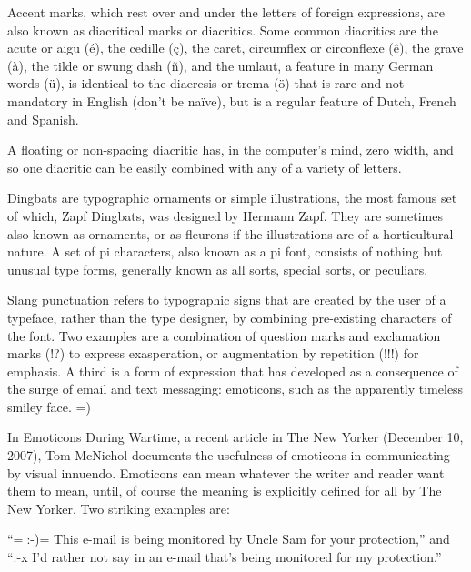 \documentclass[12pt,a4paper,twocolumn]{book} %
\begin{document}
Accent marks, which rest over and under the letters of foreign expressions, are also known as diacritical marks or diacritics. Some common diacritics are the acute or aigu (é), the cedille (ç), the caret, circumflex or circonflexe (ê), the grave (à), the tilde or swung dash (ñ), and the umlaut, a feature in many German words (ü), is identical to the diaeresis or trema (ö) that is rare and not mandatory in English (don’t be naïve), but is a regular feature of Dutch, French and Spanish.

A floating or non-spacing diacritic has, in the computer’s mind, zero width, and so one diacritic can be easily combined with any of a variety of letters.

Dingbats are typographic ornaments or simple illustrations, the most famous set of which, Zapf Dingbats, was designed by Hermann Zapf. They are sometimes also known as ornaments, or as fleurons if the illustrations are of a horticultural nature. A set of pi characters, also known as a pi font, consists of nothing but unusual type forms, generally known as all sorts, special sorts, or peculiars.

Slang punctuation refers to typographic signs that are created by the user of a typeface, rather than the type designer, by combining pre-existing characters of the font. Two examples are a combination of question marks and exclamation marks (!?) to express exasperation, or augmentation by repetition (!!!) for emphasis. A third is a form of expression that has developed as a consequence of the surge of email and text messaging: emoticons, such as the apparently timeless smiley face. =)

In Emoticons During Wartime, a recent article in The New Yorker (December 10, 2007), Tom McNichol documents the usefulness of emoticons in communicating by visual innuendo. Emoticons can mean whatever the writer and reader want them to mean, until, of course the meaning is explicitly defined for all by The New Yorker. Two striking examples are:

“=|:-)= This e-mail is being monitored by Uncle Sam for your protection,” and “:-x I’d rather not say in an e-mail that’s being monitored for my protection.”
\end{document}
